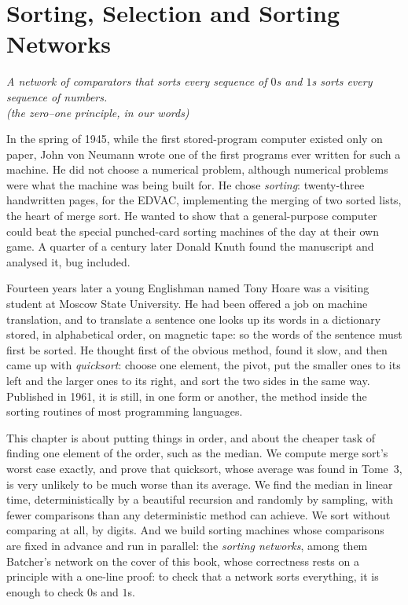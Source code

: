 \chapter{Sorting, Selection and Sorting Networks}\label{ch:sorting}

\begin{center}\itshape
A network of comparators that sorts every sequence of $0$s and $1$s sorts every sequence of numbers.\\
\upshape(the zero--one principle, in our words)
\end{center}

In the spring of 1945, while the first stored-program computer existed only on paper, John von Neumann wrote one of the first programs
ever written for such a machine. He did not choose a numerical problem, although numerical problems were what the machine was being
built for. He chose \emph{sorting}: twenty-three handwritten pages, for the EDVAC, implementing the merging of two sorted lists, the heart of
merge sort. He wanted to show that a general-purpose computer could beat the special punched-card sorting machines of the day at their own
game. A quarter of a century later Donald Knuth found the manuscript and analysed it, bug included.

Fourteen years later a young Englishman named Tony Hoare was a visiting student at Moscow State University. He had been offered a job
on machine translation, and to translate a sentence one looks up its words in a dictionary stored, in alphabetical order, on magnetic
tape: so the words of the sentence must first be sorted. He thought first of the obvious method, found it slow, and then came up with
\emph{quicksort}: choose one element, the pivot, put the smaller ones to its left and the larger ones to its right, and sort the two sides in
the same way. Published in 1961, it is still, in one form or another, the method inside the sorting routines of most programming
languages.

This chapter is about putting things in order, and about the cheaper task of finding one element of the order, such as the median. We
compute merge sort's worst case exactly, and prove that quicksort, whose average was found in Tome~3, is very unlikely to be much
worse than its average. We find the median in linear time, deterministically by a beautiful recursion and randomly by sampling, with
fewer comparisons than any deterministic method can achieve. We sort without comparing at all, by digits. And we build sorting machines
whose comparisons are fixed in advance and run in parallel: the \emph{sorting networks}, among them Batcher's network on the cover of this
book, whose correctness rests on a principle with a one-line proof: to check that a network sorts everything, it is enough to check $0$s and $1$s.


